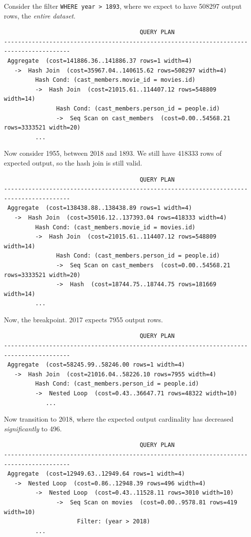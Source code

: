 \documentclass{article}
\begin{document}
\begin{enumerate}
Consider the filter \verb|WHERE year > 1893|, where we expect to have 508297 output rows, the \emph{entire dataset}.
\begin{verbatim}
                                       QUERY PLAN                                        
-----------------------------------------------------------------------------------------
 Aggregate  (cost=141886.36..141886.37 rows=1 width=4)
   ->  Hash Join  (cost=35967.04..140615.62 rows=508297 width=4)
         Hash Cond: (cast_members.movie_id = movies.id)
         ->  Hash Join  (cost=21015.61..114407.12 rows=548809 width=14)
               Hash Cond: (cast_members.person_id = people.id)
               ->  Seq Scan on cast_members  (cost=0.00..54568.21 rows=3333521 width=20)
         ...
\end{verbatim}

Now consider 1955, between 2018 and 1893. We still have 418333 rows of expected output, so the hash join is still valid.
\begin{verbatim}
                                       QUERY PLAN                                        
-----------------------------------------------------------------------------------------
 Aggregate  (cost=138438.88..138438.89 rows=1 width=4)
   ->  Hash Join  (cost=35016.12..137393.04 rows=418333 width=4)
         Hash Cond: (cast_members.movie_id = movies.id)
         ->  Hash Join  (cost=21015.61..114407.12 rows=548809 width=14)
               Hash Cond: (cast_members.person_id = people.id)
               ->  Seq Scan on cast_members  (cost=0.00..54568.21 rows=3333521 width=20)
               ->  Hash  (cost=18744.75..18744.75 rows=181669 width=14)
         ...
\end{verbatim}

Now, the breakpoint. 2017 expects 7955 output rows.
\begin{verbatim}
                                       QUERY PLAN
-----------------------------------------------------------------------------------------
 Aggregate  (cost=58245.99..58246.00 rows=1 width=4)
   ->  Hash Join  (cost=21016.04..58226.10 rows=7955 width=4)
         Hash Cond: (cast_members.person_id = people.id)
         ->  Nested Loop  (cost=0.43..36647.71 rows=48322 width=10)
            ...
\end{verbatim}

Now transition to 2018, where the expected output cardinality has decreased \emph{significantly} to 496.
\begin{verbatim}
                                       QUERY PLAN
-----------------------------------------------------------------------------------------
 Aggregate  (cost=12949.63..12949.64 rows=1 width=4)
   ->  Nested Loop  (cost=0.86..12948.39 rows=496 width=4)
         ->  Nested Loop  (cost=0.43..11528.11 rows=3010 width=10)
               ->  Seq Scan on movies  (cost=0.00..9578.81 rows=419 width=10)
                     Filter: (year > 2018)
         ...
\end{verbatim}


\end{enumerate}
\end{document}
